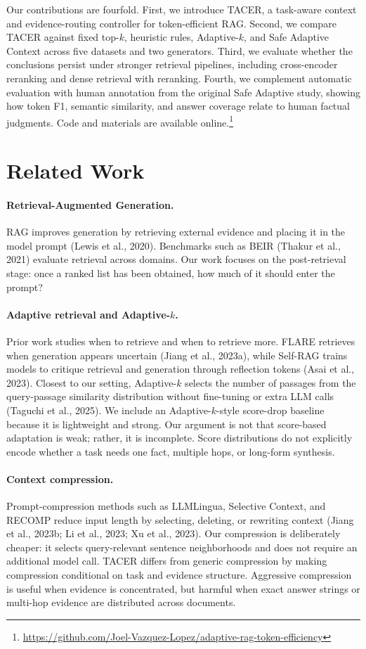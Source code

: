 \documentclass[11pt]{article}
\begin{document}
Our contributions are fourfold. First, we introduce TACER, a task-aware context and evidence-routing controller for token-efficient RAG. Second, we compare TACER against fixed top-$k$, heuristic rules, Adaptive-$k$, and Safe Adaptive Context across five datasets and two generators. Third, we evaluate whether the conclusions persist under stronger retrieval pipelines, including cross-encoder reranking and dense retrieval with reranking. Fourth, we complement automatic evaluation with human annotation from the original Safe Adaptive study, showing how token F1, semantic similarity, and answer coverage relate to human factual judgments. Code and materials are available online.\footnote{\url{https://github.com/Joel-Vazquez-Lopez/adaptive-rag-token-efficiency}}

\section{Related Work}

\paragraph{Retrieval-Augmented Generation.}
RAG improves generation by retrieving external evidence and placing it in the model prompt (Lewis et al., 2020). Benchmarks such as BEIR (Thakur et al., 2021) evaluate retrieval across domains. Our work focuses on the post-retrieval stage: once a ranked list has been obtained, how much of it should enter the prompt?

\paragraph{Adaptive retrieval and Adaptive-$k$.}
Prior work studies when to retrieve and when to retrieve more. FLARE retrieves when generation appears uncertain (Jiang et al., 2023a), while Self-RAG trains models to critique retrieval and generation through reflection tokens (Asai et al., 2023). Closest to our setting, Adaptive-$k$ selects the number of passages from the query-passage similarity distribution without fine-tuning or extra LLM calls (Taguchi et al., 2025). We include an Adaptive-$k$-style score-drop baseline because it is lightweight and strong. Our argument is not that score-based adaptation is weak; rather, it is incomplete. Score distributions do not explicitly encode whether a task needs one fact, multiple hops, or long-form synthesis.

\paragraph{Context compression.}
Prompt-compression methods such as LLMLingua, Selective Context, and RECOMP reduce input length by selecting, deleting, or rewriting context (Jiang et al., 2023b; Li et al., 2023; Xu et al., 2023). Our compression is deliberately cheaper: it selects query-relevant sentence neighborhoods and does not require an additional model call. TACER differs from generic compression by making compression conditional on task and evidence structure. Aggressive compression is useful when evidence is concentrated, but harmful when exact answer strings or multi-hop evidence are distributed across documents.
\end{document}
